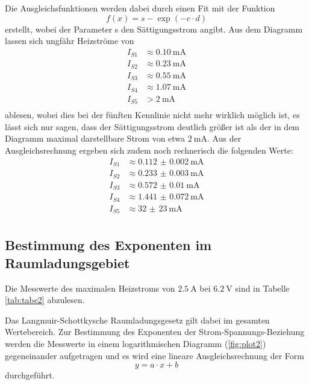 Die Ausgleichsfunktionen werden dabei durch einen Fit mit der Funktion
\begin{equation}
  f(x) = s- \exp{(-c\cdot d)}
\end{equation}
erstellt, wobei der Parameter s den Sättigungsstrom angibt.
Aus dem Diagramm lassen sich ungfähr Heizströme von
\begin{align*}
  I_{S1} &\approx \SI{0.10}{\milli\ampere}  \\
  I_{S2} &\approx \SI{0.23}{\milli\ampere}  \\
  I_{S3} &\approx \SI{0.55}{\milli\ampere}  \\
  I_{S4} &\approx \SI{1.07}{\milli\ampere}  \\
  I_{S5} &> \SI{2}{\milli\ampere}  \\
\end{align*}
ablesen, wobei dies bei der fünften Kennlinie nicht mehr wirklich möglich ist, es lässt sich nur sagen,
dass der Sättigungsstrom deutlich größer ist als der in dem Diagramm maximal darstellbare
Strom von etwa $\SI{2}{\milli\ampere}$.
Aus der Ausgleichsrechnung ergeben sich zudem noch rechnerisch die folgenden Werte:
\begin{align*}
  I_{S1} &\approx \SI{0.112(2)}{\milli\ampere}  \\
  I_{S2} &\approx \SI{0.233(3)}{\milli\ampere}  \\
  I_{S3} &\approx \SI{0.572(10)}{\milli\ampere}  \\
  I_{S4} &\approx \SI{1.441(72)}{\milli\ampere}  \\
  I_{S5} &\approx \SI{32(23)}{\milli\ampere} \\
\end{align*}

\subsection{Bestimmung des Exponenten im Raumladungsgebiet}
Die Messwerte des maximalen Heizstroms von $\SI{2.5}{\ampere}$ bei $\SI{6.2}{\volt}$
sind in Tabelle \ref{tab:tabe2} abzulesen.

Das Langmuir-Schottkysche Raumladungsgesetz gilt dabei im gesamten Wertebereich.
Zur Bestimmung des Exponenten der Strom-Spannungs-Beziehung werden die Messwerte
in einem logarithmischen Diagramm (\ref{fig:plot2}) gegeneinander aufgetragen und
es wird eine lineare Ausgleichsrechnung der Form
\begin{equation}
  y = a\cdot x +b
  \label{eqn:linear}
\end{equation}
durchgeführt.

